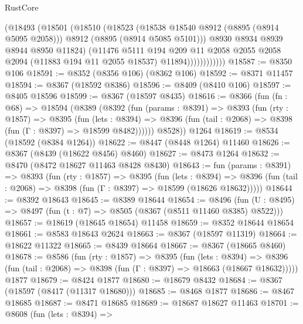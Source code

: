 \begin{lexlean}{RustCore}
\begin{coremodule}
                      (@18493
                        (@18501
                          (@18510
                            (@18523
                              (@18538 @18540 @8912 (@8895 (@8914 @5095 @2058)))
                              @8912
                              (@8895 (@8914 @5085 @5101)))
                            @8930
                            @8934
                            @8939
                            @8944
                            @8950
                            @11824)
                          (@11476
                            @5111
                            @194
                            @209
                            @11
                            @2058
                            @2055
                            @2058
                            @2094
                            (@11883 @194 @11 @2055 @18537)
                            @11894))))))))))))
@18587 := @8350 @106
@18591 := @8352 (@8356 @106) (@8362 @106)
@18592 := @8371 @11457
@18594 := @8367 (@18592 @8386)
@18596 := @8409 (@8410 @106)
@18597 := @8405 @18596
@18599 := @8367 (@18597 @8435)
@18616 := @8366
    (fun (fn : @68) =>
    @18594
      (@8389
        (@8392
          (fun (params : @8391) =>
          @8393
            (fun (rty : @1857) =>
            @8395
              (fun (lets : @8394) =>
              @8396 (fun (tail : @2068) => @8398 (fun (Γ : @8397) => @18599 @8482))))))
        @8528))
    @1264
@18619 := @8534 (@18592 (@8384 @1264))
@18622 := @8447 (@8448 @1264) @11460
@18626 := @8367 (@8439 (@18622 @8456) @8460)
@18627 := @8473 @1264
@18632 := @8470 (@8472 @18627 @11463 @8428 @8430)
@18643 := fun (params : @8391) =>
  @8393
    (fun (rty : @1857) =>
    @8395
      (fun (lets : @8394) =>
      @8396 (fun (tail : @2068) => @8398 (fun (Γ : @8397) => @18599 (@18626 @18632)))))
@18644 := @8392 @18643
@18645 := @8389 @18644
@18654 := @8496
    (fun (U : @8495) => @8497 (fun (t : @7) => @8505 (@8367 (@8511 @11460 @8385) @8522)))
@18657 := @18619 (@18645 @18654) @11458
@18659 := @8352 @18644 @18654
@18661 := @8583 @18643 @2624
@18663 := @8367 (@18597 @11319)
@18664 := @18622 @11322
@18665 := @8439 @18664
@18667 := @8367 (@18665 @8460)
@18678 := @8586
    (fun (rty : @1857) =>
    @8395
      (fun (lets : @8394) =>
      @8396 (fun (tail : @2068) => @8398 (fun (Γ : @8397) => @18663 (@18667 @18632)))))
    @1877
@18679 := @8424 @1877
@18680 := @18679 @8432
@18684 := @8367 (@18597 (@8417 (@11317 @18680)))
@18685 := @8468 @1877
@18686 := @8467 @18685
@18687 := @8471 @18685
@18689 := @18687 @18627 @11463
@18701 := @8608
    (fun (lets : @8394) =>

\end{coremodule}
\end{lexlean}
